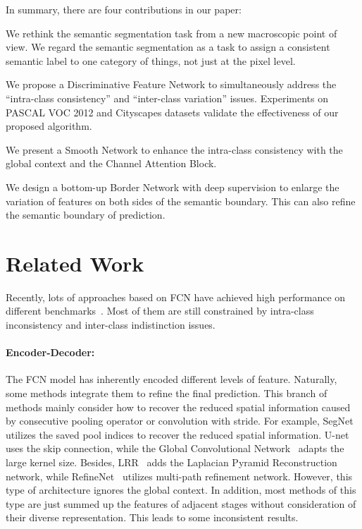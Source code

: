 \documentclass[10pt,twocolumn,letterpaper]{article}
\begin{document}
In summary, there are four contributions in our paper:
\begin{compactitem}
    \item We rethink the semantic segmentation task from a new macroscopic point of view. We regard the semantic segmentation as a task to assign a consistent semantic label to one category of things, not just at the pixel level.
	\item We propose a Discriminative Feature Network to simultaneously address the ``intra-class consistency'' and ``inter-class variation'' issues. Experiments on PASCAL VOC 2012 and Cityscapes datasets validate the effectiveness of our proposed algorithm.
	\item We present a Smooth Network to enhance the intra-class consistency with the global context and the Channel Attention Block.
	\item We design a bottom-up Border Network with deep supervision to enlarge the variation of features on both sides of the semantic boundary. This can also refine the semantic boundary of prediction.
\end{compactitem}


\section{Related Work}
\label{sec:related_work}
Recently, lots of approaches based on FCN have achieved high performance on different benchmarks~\cite{Zhou-ADE-2017,Pascal-VOC-2012,Cityscapes}.  Most of them are still constrained by intra-class inconsistency and inter-class indistinction issues. 

\vspace{-2ex}    
\paragraph{Encoder-Decoder:} The FCN model has inherently encoded different levels of feature. Naturally, some methods integrate them to refine the final prediction. This branch of methods mainly consider how to recover the reduced spatial information caused by consecutive pooling operator or convolution with stride. For example, SegNet~\cite{Badrinarayanan-PAMI-SegNet-2017} utilizes the saved pool indices to recover the reduced spatial information. U-net~\cite{Ronneberger-ICCV-U-net-2015} uses the skip connection, while the Global Convolutional Network~\cite{Peng-CVPR-Largekernl-2017} adapts the large kernel size. Besides, LRR~\cite{Ghiasi-ECCV-LRR-2016} adds the Laplacian Pyramid Reconstruction network, while RefineNet~\cite{Lin-CVPR-Refinenet-2017} utilizes multi-path refinement network. However, this type of architecture ignores the global context. In addition, most methods of this type are just summed up the features of adjacent stages without consideration of their diverse representation. This leads to some inconsistent results.  
\end{document}
